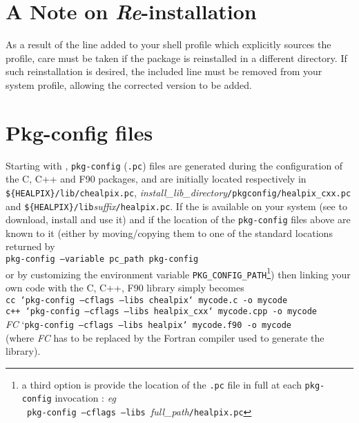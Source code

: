 \documentclass[12pt,twoside]{article}
\begin{document}


\section{A Note on {\it Re}-installation}

As a result of the line added to your shell profile which explicitly
sources the \healpix profile, care must be taken if the package 
is reinstalled in a different directory. If such reinstallation
is desired, the included line must be removed from your system profile,
allowing the corrected version to be added.  

\section{Pkg-config files}
\label{sec:pkg-config}
Starting with , \texttt{pkg-config} (\texttt{.pc}) files are generated
during the configuration of the 
C, C++ and F90 packages, and are initially located respectively in
\texttt{\$\{HEALPIX\}/lib/chealpix.pc},
{\em install\_lib\_directory}\texttt{/pkgconfig/healpix\_cxx.pc}
and 
\texttt{\$\{HEALPIX\}/lib}{\em suffix}\texttt{/healpix.pc}.
If the 
is available on your system (see 
 to download, install and
use it) and if the location of
the \healpix \texttt{pkg-config} files above are known to it (either by moving/copying them
to one of the standard locations returned by \\
\texttt{pkg-config --variable pc\_path pkg-config}\\
or by customizing the environment variable \texttt{PKG\_CONFIG\_PATH}\footnote{a
third option is provide the location of the \texttt{.pc} file in full at each
\texttt{pkg-config} invocation : {\it eg}\\ {\tt
pkg-config --cflags --libs }{\em full\_path}\texttt{/healpix.pc}}) then linking
your own code with the 
C,
C++,
F90 \healpix library simply becomes \\
\texttt{cc `pkg-config --cflags --libs chealpix` mycode.c -o mycode} \\
\texttt{c++ `pkg-config --cflags --libs healpix\_cxx` mycode.cpp -o mycode} \\
{\em FC} `\texttt{pkg-config --cflags --libs healpix` mycode.f90 -o mycode}\\
(where {\em FC} has to be replaced by the Fortran compiler used to generate the
\healpix library).
\end{document}
